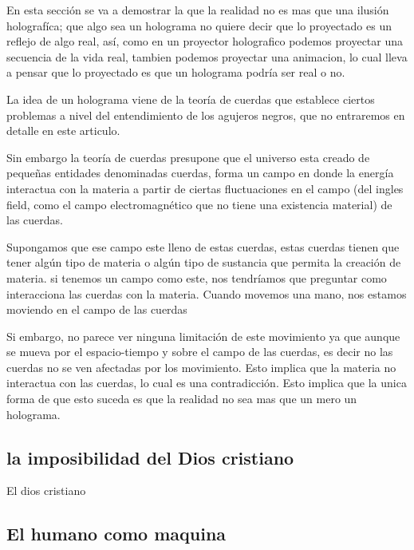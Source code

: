 \documentclass[12pt,letterpaper, a4paper ]{article}
\begin{document}
En esta sección se va a demostrar la que la realidad no es mas que una ilusión holografíca; que algo sea un holograma no quiere decir que lo proyectado es un reflejo de algo real, así, como en un proyector holografico podemos proyectar una secuencia de la vida real, tambien podemos proyectar una animacion, lo cual lleva a pensar
que lo proyectado es que un holograma podría ser real o no. 

La idea de un holograma viene de la teoría de cuerdas que establece ciertos problemas a nivel del entendimiento de los agujeros negros, que no entraremos en detalle en este articulo.

Sin embargo la teoría de cuerdas presupone que el universo esta creado de pequeñas entidades denominadas cuerdas, forma un campo en donde la energía interactua con la materia a partir de ciertas fluctuaciones en el campo (del ingles field, como el campo electromagnético que no tiene una existencia material) de las cuerdas.

Supongamos que ese campo este lleno de estas cuerdas, estas cuerdas tienen que tener algún tipo de materia o algún tipo de sustancia que permita la creación de materia. si tenemos un campo como este, nos tendríamos que preguntar como interacciona las cuerdas con la materia. Cuando movemos una mano, nos estamos moviendo en el campo de las cuerdas

Si embargo, no parece ver ninguna limitación de este movimiento ya que aunque se mueva por el espacio-tiempo y sobre el campo de las cuerdas, es decir no las cuerdas no se ven afectadas por los movimiento. Esto implica que la materia no interactua con las cuerdas, lo cual es una contradicción. Esto implica que la unica forma de que esto suceda
es que la realidad no sea mas que un mero un holograma.


\subsection{la imposibilidad del Dios cristiano}

El dios cristiano 


\subsection{El humano como maquina}
\end{document}
